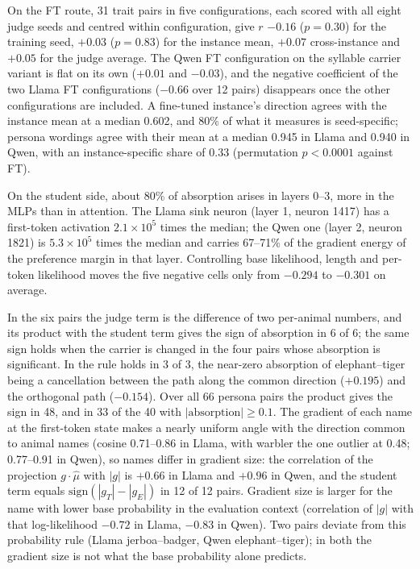 On the FT route, 31 trait pairs in five configurations, each scored with all eight judge seeds and centred within configuration, give $r$ $-0.16$ ($p = 0.30$) for the training seed, $+0.03$ ($p = 0.83$) for the instance mean, $+0.07$ cross-instance and $+0.05$ for the judge average. The Qwen FT configuration on the syllable carrier variant is flat on its own ($+0.01$ and $-0.03$), and the negative coefficient of the two Llama FT configurations ($-0.66$ over 12 pairs) disappears once the other configurations are included. A fine-tuned instance's direction agrees with the instance mean at a median 0.602, and 80\% of what it measures is seed-specific; persona wordings agree with their mean at a median 0.945 in Llama and 0.940 in Qwen, with an instance-specific share of 0.33 (permutation $p < 0.0001$ against FT).

On the student side, about 80\% of absorption arises in layers 0--3, more in the MLPs than in attention. The Llama sink neuron (layer 1, neuron 1417) has a first-token activation $2.1\times10^5$ times the median; the Qwen one (layer 2, neuron 1821) is $5.3\times10^5$ times the median and carries 67--71\% of the gradient energy of the preference margin in that layer. Controlling base likelihood, length and per-token likelihood moves the five negative cells only from $-0.294$ to $-0.301$ on average.

In the six  pairs the judge term is the difference of two per-animal numbers, and its product with the student term gives the sign of absorption in 6 of 6; the same sign holds when the carrier is changed in the four pairs whose absorption is significant. In  the rule holds in 3 of 3, the near-zero absorption of elephant--tiger being a cancellation between the path along the common direction ($+0.195$) and the orthogonal path ($-0.154$). Over all 66 persona pairs the product gives the sign in 48, and in 33 of the 40 with $|\mathrm{absorption}|\geq0.1$. The gradient of each name at the first-token state makes a nearly uniform angle with the direction common to animal names (cosine 0.71--0.86 in Llama, with warbler the one outlier at 0.48; 0.77--0.91 in Qwen), so names differ in gradient size: the correlation of the projection $g\cdot\hat\mu$ with $|g|$ is $+0.66$ in Llama and $+0.96$ in Qwen, and the student term equals $\mathrm{sign}(|g_T|-|g_E|)$ in 12 of 12 pairs. Gradient size is larger for the name with lower base probability in the evaluation context (correlation of $|g|$ with that log-likelihood $-0.72$ in Llama, $-0.83$ in Qwen). Two pairs deviate from this probability rule (Llama jerboa--badger, Qwen elephant--tiger); in both the gradient size is not what the base probability alone predicts.

